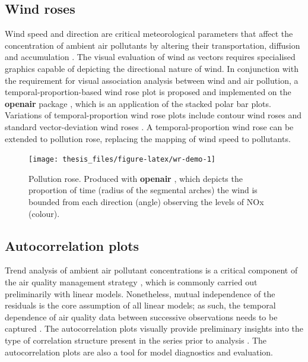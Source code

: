 \documentclass{aucklandthesis}
\begin{document}
\hypertarget{sec:wind-rose}{%
\subsection{Wind roses}\label{sec:wind-rose}}

Wind speed and direction are critical meteorological parameters that affect the concentration of ambient air pollutants by altering their transportation, diffusion and accumulation \autocite{wind}. The visual evaluation of wind as vectors requires specialised graphics capable of depicting the directional nature of wind. In conjunction with the requirement for visual association analysis between wind and air pollution, a temporal-proportion-based wind rose plot is proposed and implemented on the \textbf{openair} package \autocite{openair}, which is an application of the stacked polar bar plots. Variations of temporal-proportion wind rose plots include contour wind roses \autocite{cwr} and standard vector-deviation wind roses \autocite{vdwr}. A temporal-proportion wind rose can be extended to pollution rose, replacing the mapping of wind speed to pollutants.

\begin{figure}
\texttt{[image: thesis\_files/figure-latex/wr-demo-1]} \caption{Pollution rose. Produced with \textbf{openair} \autocite{openair}, which depicts the proportion of time (radius of the segmental arches) the wind is bounded from each direction (angle) observing the levels of NOx (colour).}\label{fig:wr-demo}
\end{figure}



\hypertarget{autocorrelation-plots}{%
\subsection{Autocorrelation plots}\label{autocorrelation-plots}}

Trend analysis of ambient air pollutant concentrations is a critical component of the air quality management strategy \autocite{aqi}, which is commonly carried out preliminarily with linear models. Nonetheless, mutual independence of the residuals is the core assumption of all linear models; as such, the temporal dependence of air quality data between successive observations needs to be captured \autocite{lm}. The autocorrelation plots visually provide preliminary insights into the type of correlation structure present in the series prior to analysis \autocite{acf}. The autocorrelation plots are also a tool for model diagnostics and evaluation.
\end{document}
